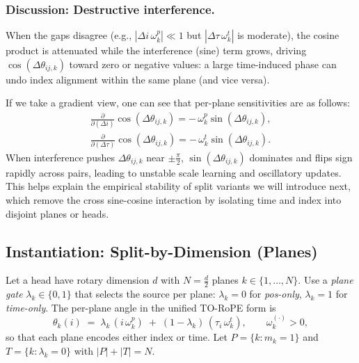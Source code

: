 \documentclass[sigconf]{acmart}
\begin{document}
\subsubsection{Discussion: Destructive interference.}
When the gaps disagree (e.g., $|\Delta i\,\omega^p_k|\!\ll\!1$ but $|\Delta\tau\,\omega^t_k|$ is moderate), the cosine product is attenuated while the interference (sine) term grows, driving $\cos(\Delta\theta_{ij,k})$ toward zero or negative values: a large time-induced phase can undo index alignment within the same plane (and vice versa).


If we take a gradient view, one can see that per-plane sensitivities are as follows:
\begin{align}
\frac{\partial}{\partial(\Delta i)}\cos(\Delta\theta_{ij,k})=-\,\omega^p_k\sin(\Delta\theta_{ij,k}),
\\
\frac{\partial}{\partial(\Delta\tau)}\cos(\Delta\theta_{ij,k})=-\,\omega^t_k\sin(\Delta\theta_{ij,k}).
\end{align}
When interference pushes $\Delta\theta_{ij,k}$ near $\pm\frac{\pi}{2}$, $\sin(\Delta\theta_{ij,k})$ dominates and flips sign rapidly across pairs, leading to unstable scale learning and oscillatory updates. This helps explain the empirical stability of split variants we will introduce next, which remove the cross sine-cosine interaction by isolating time and index into disjoint planes or heads.


\subsection{Instantiation: Split-by-Dimension (Planes)}
\label{subsec:split-dim}
Let a head have rotary dimension $d$ with $N=\tfrac{d}{2}$ planes $k\in\{1,\dots,N\}$.
Use a \emph{plane gate} $\lambda_k\in\{0,1\}$ that selects the source per plane:
$\lambda_k=0$ for \emph{pos-only}, $\lambda_k=1$ for \emph{time-only}.
The per-plane angle in the unified TO-RoPE form is
\[
\theta_k(i) \;=\; \lambda_k\, (i\,\omega^p_k)
\;+\; (1-\lambda_k)\,(\tau_i\,\omega^t_k),
\qquad
\omega^{(\cdot)}_k>0,
\]
so that each plane encodes either index or time. Let $P{=}\{k:m_k{=}1\}$ and $T{=}\{k:\lambda_k{=}0\}$ with $|P|{+}|T|{=}N$.
\end{document}
